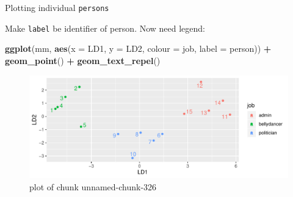 \documentclass[ignorenonframetext,]{beamer}
\newenvironment{Shaded}{\begin{snugshade}}{\end{snugshade}}
\newcommand{\DataTypeTok}[1]{\textcolor[rgb]{0.13,0.29,0.53}{#1}}
\newcommand{\KeywordTok}[1]{\textcolor[rgb]{0.13,0.29,0.53}{\textbf{#1}}}
\newcommand{\NormalTok}[1]{#1}
\newcommand{\OperatorTok}[1]{\textcolor[rgb]{0.81,0.36,0.00}{\textbf{#1}}}
\newcommand{\StringTok}[1]{\textcolor[rgb]{0.31,0.60,0.02}{#1}}
\begin{document}
\begin{frame}[fragile]{Plotting individual \texttt{persons}}
\protect\hypertarget{plotting-individual-persons}{}

Make \texttt{label} be identifier of person. Now need legend:

\begin{Shaded}
\begin{Highlighting}[]
\KeywordTok{ggplot}\NormalTok{(mm, }\KeywordTok{aes}\NormalTok{(}\DataTypeTok{x =}\NormalTok{ LD1, }\DataTypeTok{y =}\NormalTok{ LD2,  }\DataTypeTok{colour =}\NormalTok{ job, }
               \DataTypeTok{label =}\NormalTok{ person)) }\OperatorTok{+}\StringTok{ }
\StringTok{  }\KeywordTok{geom_point}\NormalTok{() }\OperatorTok{+}\StringTok{ }\KeywordTok{geom_text_repel}\NormalTok{()}
\end{Highlighting}
\end{Shaded}

\begin{figure}
\centering
\includegraphics{figure/unnamed-chunk-326-1.pdf}
\caption{plot of chunk unnamed-chunk-326}
\end{figure}

\end{frame}
\end{document}
